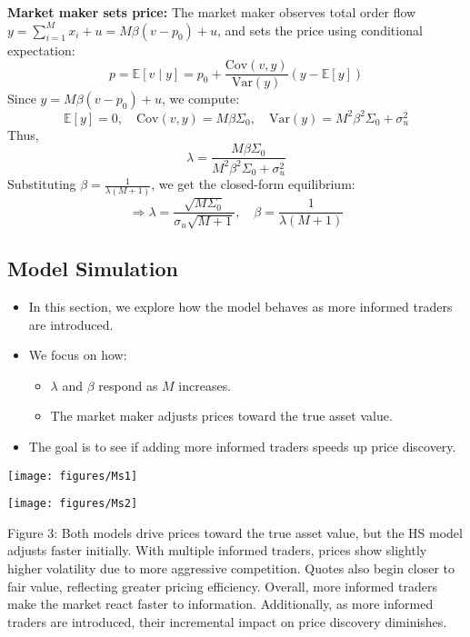 \documentclass{beamer}
\begin{document}
\begin{frame}
\begin{block}{\tiny \textbf{Market maker sets price:}}
\tiny
The market maker observes total order flow \( y = \sum_{i=1}^{M} x_i + u = M \beta (v - p_0) + u \), and sets the price using conditional expectation:
\[
p = \mathbb{E}[v \mid y] = p_0 + \frac{\text{Cov}(v, y)}{\text{Var}(y)} (y - \mathbb{E}[y])
\]
Since \( y = M \beta (v - p_0) + u \), we compute:
\[
\mathbb{E}[y] = 0, \quad \text{Cov}(v, y) = M \beta \Sigma_0, \quad \text{Var}(y) = M^2 \beta^2 \Sigma_0 + \sigma_u^2
\]
Thus,
\[
\lambda = \frac{M \beta \Sigma_0}{M^2 \beta^2 \Sigma_0 + \sigma_u^2}
\]
Substituting \( \beta = \frac{1}{\lambda(M+1)} \), we get the closed-form equilibrium:
\[
\Rightarrow \boxed{
\lambda = \frac{\sqrt{M \Sigma_0}}{\sigma_u \sqrt{M+1}}, \quad 
\beta = \frac{1}{\lambda(M+1)}
}
\]
\end{block}
\end{frame}

\subsection{Model Simulation}
\begin{frame}
\begin{itemize}
    \item In this section, we explore how the model behaves as more informed traders are introduced.
    \item We focus on how:
    \begin{itemize}
        \item $\lambda$ and $\beta$ respond as $M$ increases.
        \item The market maker adjusts prices toward the true asset value.
    \end{itemize}
    \item The goal is to see if adding more informed traders speeds up price discovery.
\end{itemize}
\end{frame}

\begin{frame}
\centering
\texttt{[image: figures/Ms1]}

\vspace{0.5em}
\texttt{[image: figures/Ms2]}

\vspace{0.5em}
{\tiny {\textcolor[RGB]{41,49,202}{Figure 3:}} Both models drive prices toward the true asset value, but the HS model adjusts faster initially. With multiple informed traders, prices show slightly higher volatility due to more aggressive competition. Quotes also begin closer to fair value, reflecting greater pricing efficiency. Overall, more informed traders make the market react faster to information. Additionally, as more informed traders are introduced, their incremental impact on price discovery diminishes.}
\end{frame}
\end{document}
